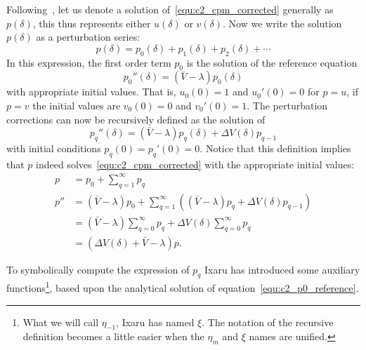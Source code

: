 Following~\cite{ixaru_numerical_1984,ixaru_cp_2000}, let us denote a solution of~\eqref{equ:c2_cpm_corrected} generally as $p(\delta)$, this thus represents either $u(\delta)$ or $v(\delta)$. Now we write the solution $p(\delta)$ as a perturbation series:
$$
    p(\delta) = p_0(\delta) + p_1(\delta) + p_2(\delta) + \cdots
$$
In this expression, the first order term $p_0$ is the solution of the reference equation
\begin{equation}\label{equ:c2_p0_reference}
    p_0''(\delta) = (\bar{V} - \lambda) p_0(\delta)
\end{equation}
with appropriate initial values. That is, $u_0(0) = 1$ and $u_0'(0) = 0$ for $p = u$, if $p=v$ the initial values are $v_0(0)=0$ and $v_0'(0) = 1$. The perturbation corrections can now be recursively defined as the solution of
\begin{equation}\label{equ:c2_pq_definition}
    p_q''(\delta) = (\bar{V} - \lambda) p_q(\delta) + \Delta V(\delta) p_{q-1}
\end{equation}
with initial conditions $p_q(0) = p_q'(0) = 0$. Notice that this definition implies that $p$ indeed solves~\eqref{equ:c2_cpm_corrected} with the appropriate initial values:
\begin{align*}
    p   & = p_0 + \sum_{q=1}^\infty p_q                                                                              \\
    p'' & = (\bar{V} - \lambda)p_0 + \sum_{q=1}^\infty\left((\bar{V} - \lambda)p_q + \Delta V(\delta) p_{q-1}\right) \\
        & = (\bar{V} - \lambda)\sum_{q=0}^\infty p_q + \Delta V(\delta) \sum_{q=0}^\infty p_q                        \\
        & = (\Delta V(\delta) + \bar{V} - \lambda)p\text{.}
\end{align*}

To symbolically compute the expression of $p_q$ Ixaru has introduced some auxiliary functions\footnote{What we will call $\eta_{-1}$, Ixaru has named $\xi$. The notation of the recursive definition becomes a little easier when the $\eta_m$ and $\xi$ names are unified.}, based upon the analytical solution of equation~\eqref{equ:c2_p0_reference}.

